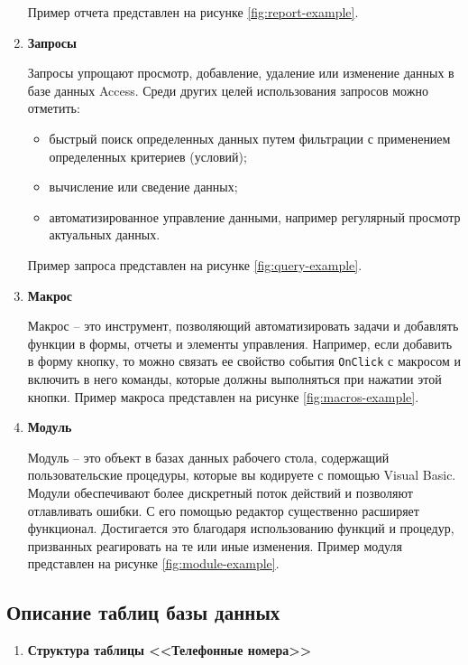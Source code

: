 \begin{enumerate}
    \tab Пример отчета представлен на рисунке \ref{fig:report-example}.
    

    \item \textbf{Запросы}
    
    \tab Запросы упрощают просмотр, добавление, удаление или изменение данных в базе данных Access. Среди других целей использования запросов можно отметить:
    \begin{itemize}
        \item быстрый поиск определенных данных путем фильтрации с применением определенных критериев (условий);
        \item вычисление или сведение данных;
        \item автоматизированное управление данными, например регулярный просмотр актуальных данных.
    \end{itemize}
    
    \tab Пример запроса представлен на рисунке \ref{fig:query-example}.


    \item \textbf{Макрос}
    
    \tab Макрос -- это инструмент, позволяющий автоматизировать задачи и добавлять функции в формы, отчеты и элементы управления. Например, если добавить в форму кнопку, то можно связать ее свойство события \texttt{OnClick} с макросом и включить в него команды, которые должны выполняться при нажатии этой кнопки. Пример макроса представлен на рисунке \ref{fig:macros-example}.


    \item \textbf{Модуль}
    
    \tab Модуль -- это объект в базах данных рабочего стола, содержащий пользовательские процедуры, которые вы кодируете с помощью Visual Basic. Модули обеспечивают более дискретный поток действий и позволяют отлавливать ошибки. С его помощью редактор существенно расширяет функционал. Достигается это благодаря использованию функций и процедур, призванных реагировать на те или иные изменения. Пример модуля представлен на рисунке \ref{fig:module-example}.
\end{enumerate}


\subsection{Описание таблиц базы данных}


\begin{enumerate}
    \item \textbf{Структура таблицы <<Телефонные номера>>}
\end{enumerate}